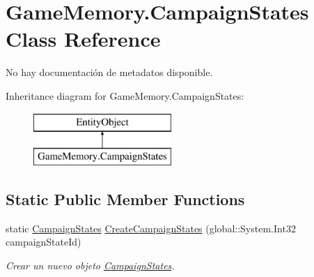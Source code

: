 \hypertarget{class_game_memory_1_1_campaign_states}{\section{Game\-Memory.\-Campaign\-States Class Reference}
\label{class_game_memory_1_1_campaign_states}
}


No hay documentación de metadatos disponible.  


Inheritance diagram for Game\-Memory.\-Campaign\-States\-:\begin{figure}[H]
\begin{center}
\leavevmode
\includegraphics[height=2.000000cm]{class_game_memory_1_1_campaign_states}
\end{center}
\end{figure}
\subsection*{Static Public Member Functions}
\begin{DoxyCompactItemize}
\item 
static \hyperlink{class_game_memory_1_1_campaign_states}{Campaign\-States} \hyperlink{class_game_memory_1_1_campaign_states_add9051f7e065e73ad9ffaf36e2e103aa}{Create\-Campaign\-States} (global\-::\-System.\-Int32 campaign\-State\-Id)
\begin{DoxyCompactList}\small\item\em Crear un nuevo objeto \hyperlink{class_game_memory_1_1_campaign_states}{Campaign\-States}. \end{DoxyCompactList}\end{DoxyCompactItemize}
